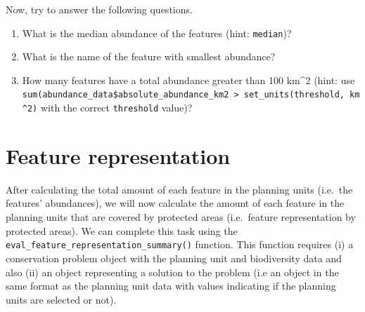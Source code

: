 \documentclass[
  12pt,
]{book}
\makeatletter
\newenvironment{Shaded}{\begin{snugshade}}{\end{snugshade}}
\newcommand{\CommentTok}[1]{\textcolor[rgb]{0.56,0.35,0.01}{\textit{#1}}}
\newcommand{\KeywordTok}[1]{\textcolor[rgb]{0.13,0.29,0.53}{\textbf{#1}}}
\newcommand{\NormalTok}[1]{#1}
\newcommand{\OperatorTok}[1]{\textcolor[rgb]{0.81,0.36,0.00}{\textbf{#1}}}
\newcommand{\StringTok}[1]{\textcolor[rgb]{0.31,0.60,0.02}{#1}}
\providecommand{\tightlist}{%
  \setlength{\itemsep}{0pt}\setlength{\parskip}{0pt}}
\newenvironment{kframe}{%
\medskip{}
\setlength{\fboxsep}{.8em}
 \def\at@end@of@kframe{}%
 \ifinner\ifhmode%
  \def\at@end@of@kframe{\end{minipage}}%
  \begin{minipage}{\columnwidth}%
 \fi\fi%
 \def\FrameCommand##1{\hskip\@totalleftmargin \hskip-\fboxsep
 \colorbox{shadecolor}{##1}\hskip-\fboxsep
     \hskip-\linewidth \hskip-\@totalleftmargin \hskip\columnwidth}%
 \MakeFramed {\advance\hsize-\width
   \@totalleftmargin\z@ \linewidth\hsize
   \@setminipage}}%
 {\par\unskip\endMakeFramed%
 \at@end@of@kframe}
\newenvironment{rmdblock}[1]
  {
  \begin{itemize}
  \renewcommand{\labelitemi}{
    \raisebox{-.7\height}[0pt][0pt]{
      {\setkeys{Gin}{width=3em,keepaspectratio}\texttt{[image: images/\#1]}}
    }
  }
  \setlength{\fboxsep}{1em}
  \begin{kframe}
  \item
  }
  {
  \end{kframe}
  \end{itemize}
  }
\newenvironment{rmdquestion}
  {\begin{rmdblock}{question}}
  {\end{rmdblock}}
\makeatother
\begin{document}
Now, try to answer the following questions.

\begin{rmdquestion}
\begin{enumerate}
\def\labelenumi{\arabic{enumi}.}
\tightlist
\item
  What is the median abundance of the features (hint: \texttt{median})?
\item
  What is the name of the feature with smallest abundance?
\item
  How many features have a total abundance greater than 100 km\^{}2 (hint: use \texttt{sum(abundance\_data\$absolute\_abundance\_km2\ \textgreater{}\ set\_units(threshold,\ km\^{}2)} with the correct \texttt{threshold} value)?
\end{enumerate}
\end{rmdquestion}

\hypertarget{feature-representation}{%
\section{Feature representation}\label{feature-representation}}

After calculating the total amount of each feature in the planning units (i.e.~the features' abundances), we will now calculate the amount of each feature in the planning units that are covered by protected areas (i.e.~feature representation by protected areas). We can complete this task using the \texttt{eval\_feature\_representation\_summary()} function. This function requires (i) a conservation problem object with the planning unit and biodiversity data and also (ii) an object representing a solution to the problem (i.e an object in the same format as the planning unit data with values indicating if the planning units are selected or not).

\begin{Shaded}
\end{Shaded}
\end{document}
